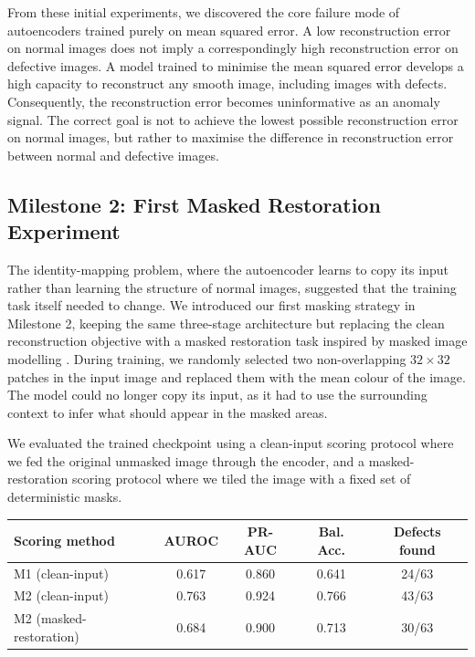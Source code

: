 \documentclass[11pt, a4paper]{article}
\begin{document}
From these initial experiments, we discovered the core failure mode of autoencoders trained purely on mean squared error. A low reconstruction error on normal images does not imply a correspondingly high reconstruction error on defective images. A model trained to minimise the mean squared error develops a high capacity to reconstruct any smooth image, including images with defects. Consequently, the reconstruction error becomes uninformative as an anomaly signal. The correct goal is not to achieve the lowest possible reconstruction error on normal images, but rather to maximise the difference in reconstruction error between normal and defective images.

\subsection{Milestone 2: First Masked Restoration Experiment}
\label{sec:ae2}

The identity-mapping problem, where the autoencoder learns to copy its input rather than learning the structure of normal images, suggested that the training task itself needed to change. We introduced our first masking strategy in Milestone 2, keeping the same three-stage architecture but replacing the clean reconstruction objective with a masked restoration task inspired by masked image modelling \cite{he2022mae}. During training, we randomly selected two non-overlapping $32 \times 32$ patches in the input image and replaced them with the mean colour of the image. The model could no longer copy its input, as it had to use the surrounding context to infer what should appear in the masked areas.

We evaluated the trained checkpoint using a clean-input scoring protocol where we fed the original unmasked image through the encoder, and a masked-restoration scoring protocol where we tiled the image with a fixed set of deterministic masks.

\begin{center}
\footnotesize
\begin{tabular}{lcccc}
\toprule
\textbf{Scoring method} & \textbf{AUROC} & \textbf{PR-AUC} & \textbf{Bal. Acc.} & \textbf{Defects found} \\
\midrule
M1 (clean-input) & 0.617 & 0.860 & 0.641 & 24/63 \\
M2 (clean-input) & 0.763 & 0.924 & 0.766 & 43/63 \\
M2 (masked-restoration) & 0.684 & 0.900 & 0.713 & 30/63 \\
\bottomrule
\end{tabular}
\end{center}
\end{document}
